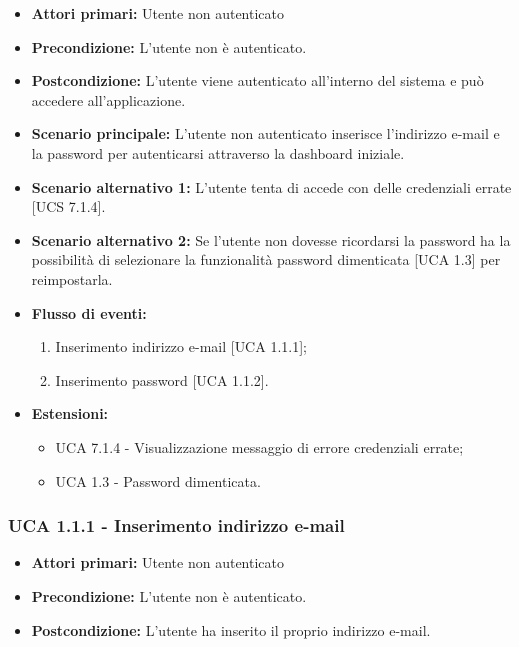 \begin{itemize}
\item \textbf{Attori primari:} Utente non autenticato
\item \textbf{Precondizione:} L'utente non è autenticato.
\item \textbf{Postcondizione:} L'utente viene autenticato all'interno del sistema e può accedere all'applicazione.
\item \textbf{Scenario principale:} L'utente non autenticato inserisce l'indirizzo e-mail e la password per autenticarsi attraverso la dashboard iniziale.%
\item \textbf{Scenario alternativo 1:} L'utente tenta di accede con delle credenziali errate [UCS 7.1.4].
\item \textbf{Scenario alternativo 2:} Se l'utente non dovesse ricordarsi la password ha la possibilità di selezionare la funzionalità password dimenticata [UCA 1.3] per reimpostarla.
\item \textbf{Flusso di eventi:} %
  \begin{enumerate}
        \item Inserimento indirizzo e-mail [UCA 1.1.1];
        \item Inserimento password [UCA 1.1.2].
    \end{enumerate}
\item \textbf{Estensioni:}
	\begin{itemize}
		\item UCA 7.1.4 - Visualizzazione messaggio di errore credenziali errate;
		\item UCA 1.3 - Password dimenticata.
	\end{itemize}
\end{itemize}

\subsubsection{UCA 1.1.1 - Inserimento indirizzo e-mail}%
\begin{itemize}
\item \textbf{Attori primari:}  Utente non autenticato
\item \textbf{Precondizione:}  L'utente non è autenticato.
\item \textbf{Postcondizione:}  L'utente ha inserito il proprio indirizzo e-mail.
\end{itemize}

